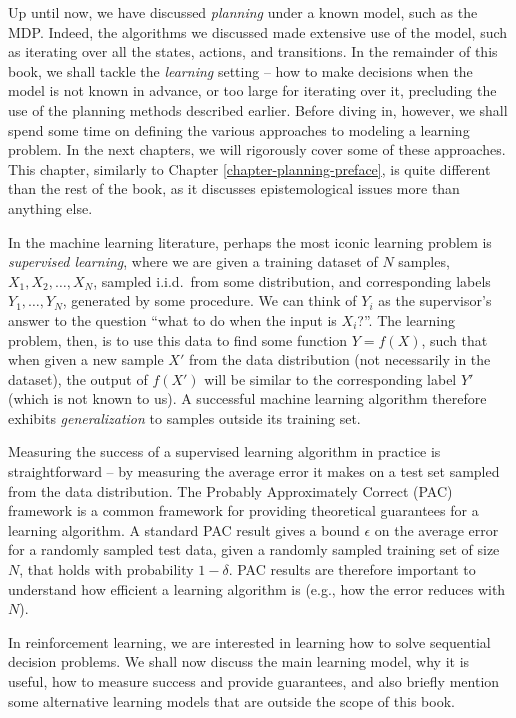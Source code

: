 Up until now, we have discussed \textit{planning} under a known model, such as the MDP. Indeed, the algorithms we discussed made extensive use of the model, such as iterating over all the states, actions, and transitions.
In the remainder of this book, we shall tackle the \textit{learning} setting -- how to make decisions when the model is not known in advance, or too large for iterating over it, precluding the use of the planning methods described earlier. Before diving in, however, we shall spend some time on defining the various approaches to modeling a learning problem. In the next chapters, we will rigorously cover some of these approaches. This chapter, similarly to Chapter \ref{chapter-planning-preface}, is quite different than the rest of the book, as it discusses epistemological issues more than anything else. 

In the machine learning literature, perhaps the most iconic learning problem is \textit{supervised learning}, where we are given a training dataset of $N$ samples, $X_1,X_2,\dots, X_N$, sampled i.i.d.~from some distribution, and corresponding labels $Y_1,\dots,Y_N$, generated by some procedure. We can think of $Y_i$ as the supervisor's answer to the question ``what to do when the input is $X_i$?''. The learning problem, then, is to use this data to find some function $Y = f(X)$, such that when given a new sample $X'$ from the data distribution (not necessarily in the dataset), the output of $f(X')$ will be similar to the corresponding label $Y'$ (which is not known to us). A successful machine learning algorithm therefore exhibits \textit{generalization} to samples outside its training set.

Measuring the success of a supervised learning algorithm in practice is straightforward -- by measuring the average error it makes on a test set sampled from the data distribution. The Probably Approximately Correct (PAC) framework is a common framework for providing theoretical guarantees for a learning algorithm. A standard PAC result gives a bound $\epsilon$ on the average error for a randomly sampled test data, given a randomly sampled training set of size $N$, that holds with probability $1 - \delta$. PAC results are therefore important to understand how efficient a learning algorithm is (e.g., how the error reduces with $N$).

In reinforcement learning, we are interested in learning how to solve sequential decision problems. We shall now discuss the main learning model, why it is useful, how to measure success and provide guarantees, and also briefly mention some alternative learning models that are outside the scope of this book.

